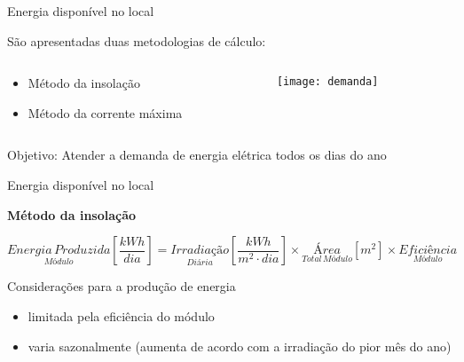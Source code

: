\begin{frame}{Energia disponível no local}

São apresentadas duas metodologias de cálculo:

\vspace{.5cm}
		
\begin{columns}[T]
    \begin{column}{0.5\textwidth}
		\vspace{.5cm}
		\begin{itemize}
			\item Método da insolação
			\item Método da corrente máxima
		\end{itemize}
    \end{column}
    \begin{column}{0.5\textwidth}    
		\centering
      	\texttt{[image: demanda]}
    \end{column}
\end{columns}

\vspace{.5cm}
		
\begin{exampleblock}{}
\begin{center}
Objetivo: Atender a demanda de energia elétrica todos os dias do ano
\end{center} 
\end{exampleblock}

\end{frame}

\begin{frame}{Energia disponível no local}

\textbf{Método da insolação}

\vspace{.5cm}

\begin{footnotesize}
	\begin{equation*}
	\underset{Módulo}{Energia \, Produzida}\left [ \frac{kWh}{dia} \right ]=\underset{Diária}{Irradiação}\left [ \frac{kWh}{m^2 \cdot dia} \right ] \times \underset{Total \, Módulo}{Área }\left [ m^2 \right ] \times \underset{Módulo}{Eficiência}
	\end{equation*}
\end{footnotesize}

\vspace{.5cm}

\begin{exampleblock}{Considerações para a produção de energia}
	\begin{itemize}
		\item limitada pela eficiência do módulo
		\item varia sazonalmente (aumenta de acordo com a irradiação do pior mês do ano)
	\end{itemize}
\end{exampleblock}

\end{frame}


